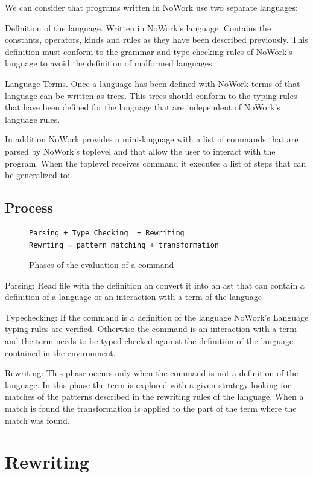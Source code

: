 \documentclass[12pt,a4paper]{article}
\begin{document}
We can consider that programs written in NoWork use two separate languages:

Definition of the language. Written in NoWork's language. Contains the
constants, operators, kinds and rules as they have been described
previously. This definition must conform to the grammar and type
checking rules of NoWork's language to avoid the definition of
malformed languages.

Language Terms. Once a language has been defined with NoWork terms of
that language can be written as trees. This trees should conform to the
typing rules that have been defined for the language that are
independent of NoWork's language rules.

In addition NoWork provides a mini-language with a list of commands that are parsed by
NoWork's toplevel and that allow the user to interact with the
program. When the toplevel receives command it executes a list of
steps that can be generalized to:

\subsection{Process}

\begin{figure}[!h]
\begin{verbatim}
Parsing + Type Checking  + Rewriting
Rewrting = pattern matching + transformation
\end{verbatim}
\caption{ Phases of the evaluation of a command }
\end{figure}

Parsing: Read file with the definition an convert it into an ast that
can contain a definition of a language or an interaction with a term
of the language

Typechecking: If the command is a definition of the language NoWork's
Language typing rules are verified. Otherwise the command is an interaction with a
term and the term needs to be typed checked against the definition of
the language contained in the environment.

Rewriting: This phase occurs only when the command is not a definition
of the language. In this phase the term is explored with a
given strategy looking for matches of the patterns described in the
rewriting rules of the language. When a match is found the
transformation is applied to the part of the term where the match
was found.

\section{Rewriting}
\end{document}
